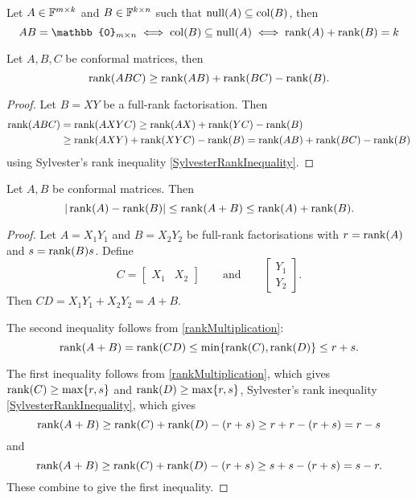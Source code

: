 \begin{corollary}
Let $A\in\mathbb{F}^{m\times k}$ and $B\in\mathbb{F}^{k\times n}$ such that $\operatorname{null}(A)\subseteq \operatorname{col}(B)$, then
\[ AB = \mathbb{0}_{m\times n} \iff \Col(B)\subseteq \Null(A) \iff \Rank(A) + \Rank(B) = k \]
\end{corollary}

\begin{proposition}
Let $A,B,C$ be conformal matrices, then
\[ \operatorname{rank}(ABC) \geq \operatorname{rank}(AB)+\operatorname{rank}(BC) - \operatorname{rank}(B). \]
\end{proposition}
\begin{proof}
Let $B = XY$ be a full-rank factorisation. Then
\begin{align*}
\operatorname{rank}(ABC) &= \operatorname{rank}(AXYC) \geq \operatorname{rank}(AX) + \operatorname{rank}(YC) - \operatorname{rank}(B) \\
&\geq \operatorname{rank}(AXY) + \operatorname{rank}(XYC) - \operatorname{rank}(B) = \operatorname{rank}(AB)+\operatorname{rank}(BC) - \operatorname{rank}(B)
\end{align*}
using Sylvester's rank inequality \ref{SylvesterRankInequality}.
\end{proof}

\begin{proposition}
Let $A,B$ be conformal matrices. Then
\[ |\operatorname{rank}(A)-\operatorname{rank}(B)|\leq\operatorname{rank}(A+B)\leq \operatorname{rank}(A) + \operatorname{rank}(B). \]
\end{proposition}
\begin{proof}
Let $A=X_1Y_1$ and $B=X_2Y_2$ be full-rank factorisations with $r = \operatorname{rank}(A)$ and $s=\operatorname{rank}(B)s$. Define
\[ C = \begin{bmatrix}
X_1 & X_2
\end{bmatrix}\qquad\text{and}\qquad \begin{bmatrix}
Y_1 \\ Y_2
\end{bmatrix}. \]
Then $CD = X_1Y_1 + X_2Y_2 = A+B$.

The second inequality follows from \ref{rankMultiplication}:
\[ \operatorname{rank}(A+B) = \operatorname{rank}(CD) \leq \min\{\operatorname{rank}(C),\operatorname{rank}(D)\} \leq r+s. \]

The first inequality follows from \ref{rankMultiplication}, which gives $\operatorname{rank}(C)\geq\max\{r,s\}$ and $\operatorname{rank}(D)\geq\max\{r,s\}$, Sylvester's rank inequality \ref{SylvesterRankInequality}, which gives
\[ \operatorname{rank}(A+B) \geq \operatorname{rank}(C) + \operatorname{rank}(D) - (r+s) \geq r+r-(r+s) = r-s \]
and
\[ \operatorname{rank}(A+B) \geq \operatorname{rank}(C) + \operatorname{rank}(D) - (r+s) \geq s+s-(r+s) = s-r. \]
These combine to give the first inequality.
\end{proof}

